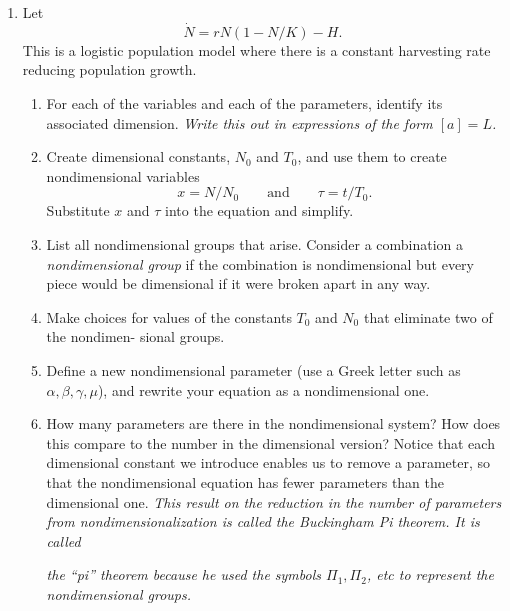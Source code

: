 \documentclass[12pt]{amsart}
\theoremstyle{conjecture}
\theoremstyle{definition}
\theoremstyle{question}
\theoremstyle{theorem}
\begin{document}
    \begin{enumerate}
        \item Let
        \[
            \dot N = rN(1-N/K)-H.
        \]
        This is a logistic population model where there is a constant harvesting rate reducing
        population growth.

        \begin{enumerate}
            \item For each of the variables and each of the parameters, identify its associated dimension.
            \textit{Write this out in expressions of the form $[a]=L$.}

            \item Create dimensional constants, $N_0$ and $T_0$, and use them to create nondimensional variables
            \[
                x=N/N_0
                \qquad\text{and}\qquad
                \tau=t/T_0.
            \]
            Substitute $x$ and $\tau$ into the equation and simplify.

            \item List all nondimensional groups that arise. Consider a combination a \textit{nondimensional group}
            if the combination is nondimensional but every piece would be dimensional if it were broken
            apart in any way.

            \item Make choices for values of the constants $T_0$ and $N_0$ that eliminate two of the nondimen-
            sional groups.

            \item Define a new nondimensional parameter (use a Greek letter such as $\alpha,\beta,\gamma,\mu$), and rewrite
            your equation as a nondimensional one.

            \item How many parameters are there in the nondimensional system? How does this compare
            to the number in the dimensional version? Notice that each dimensional constant we
            introduce enables us to remove a parameter, so that the nondimensional equation has
            fewer parameters than the dimensional one.
            \textit{This result on the reduction in the number of
            parameters from nondimensionalization is called the Buckingham Pi theorem. It is called}

            \newpage

            \textit{the ``pi'' theorem because he used the symbols $\Pi_1,\Pi_2$, etc to represent the nondimensional
            groups.}
        \end{enumerate}


\end{enumerate}
\end{document}
